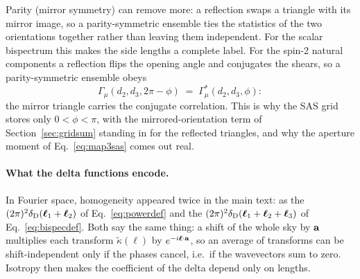 \documentclass[11pt]{article}
\newcommand{\bell}{\boldsymbol{\ell}}
\numberwithin{equation}{section}
\begin{document}
Parity (mirror symmetry) can remove more: a reflection swaps a
triangle with its mirror image, so a parity-symmetric ensemble ties
the statistics of the two orientations together rather than leaving
them independent.  For the scalar bispectrum this makes the side
lengths a complete label.  For the spin-2 natural components a
reflection flips the opening angle and conjugates the shears, so a
parity-symmetric ensemble obeys
\begin{equation}
  \Gamma_\mu(d_2, d_3, 2\pi - \phi)
  \;=\; \Gamma_\mu^{*}(d_2, d_3, \phi) :
  \label{eq:parity}
\end{equation}
the mirror triangle carries the conjugate correlation.  This is why
the SAS grid stores only $0 < \phi < \pi$, with the
mirrored-orientation term of Section~\ref{sec:gridsum} standing in
for the reflected triangles, and why the aperture moment of
Eq.~\eqref{eq:map3sas} comes out real.

\paragraph{What the delta functions encode.}
In Fourier space, homogeneity appeared twice in the main text: as
the $(2\pi)^2\delta_{\rm D}(\bell_1 + \bell_2)$ of
Eq.~\eqref{eq:powerdef} and the
$(2\pi)^2\delta_{\rm D}(\bell_1 + \bell_2 + \bell_3)$ of
Eq.~\eqref{eq:bispecdef}.  Both say the same thing: a shift of the
whole sky by $\bf a$ multiplies each transform
$\tilde\kappa(\bell)$ by $e^{-i\bell\cdot {\bf a}}$, so an average
of transforms can be shift-independent only if the phases cancel,
i.e.\ if the wavevectors sum to zero.  Isotropy then makes the
coefficient of the delta depend only on lengths.
\end{document}
